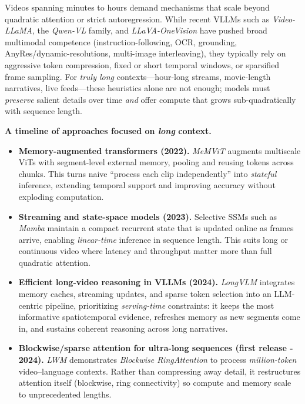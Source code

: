 \begin{enrichment}
    \label{enr:sec_chapter24_long_context}
    Videos spanning minutes to hours demand mechanisms that scale beyond quadratic attention or strict autoregression. 
    While recent VLLMs such as \emph{Video-LLaMA}, the \emph{Qwen-VL} family, and \emph{LLaVA-OneVision} have pushed broad multimodal competence (instruction-following, OCR, grounding, AnyRes/dynamic-resolutions, multi-image interleaving), they typically rely on aggressive token compression, fixed or short temporal windows, or sparsified frame sampling. 
    For \emph{truly long} contexts—hour-long streams, movie-length narratives, live feeds—these heuristics alone are not enough; models must \emph{preserve} salient details over time \emph{and} offer compute that grows sub-quadratically with sequence length.
    
    \medskip
    \noindent\textbf{A timeline of approaches focused on \emph{long} context.}
    \begin{itemize}
        \item \textbf{Memory-augmented transformers (2022).} \emph{MeMViT} \cite{wu2022_memvit} augments multiscale ViTs with segment-level external memory, pooling and reusing tokens across chunks. This turns naive “process each clip independently” into \emph{stateful} inference, extending temporal support and improving accuracy without exploding computation.
        \item \textbf{Streaming and state-space models (2023).} Selective SSMs such as \emph{Mamba} \cite{mamba2023_selective} maintain a compact recurrent state that is updated online as frames arrive, enabling \emph{linear-time} inference in sequence length. This suits long or continuous video where latency and throughput matter more than full quadratic attention.
        \item \textbf{Efficient long-video reasoning in VLLMs (2024).} \emph{LongVLM} \cite{weng2024_longvlm} integrates memory caches, streaming updates, and sparse token selection into an LLM-centric pipeline, prioritizing \emph{serving-time} constraints: it keeps the most informative spatiotemporal evidence, refreshes memory as new segments come in, and sustains coherent reasoning across long narratives.
        \item \textbf{Blockwise/sparse attention for ultra-long sequences (first release - 2024).} \emph{LWM} \cite{liu2025_lwm} demonstrates \emph{Blockwise RingAttention} to process \emph{million-token} video--language contexts. Rather than compressing away detail, it restructures attention itself (blockwise, ring connectivity) so compute and memory scale to unprecedented lengths.
    \end{itemize}
    

\end{enrichment}
